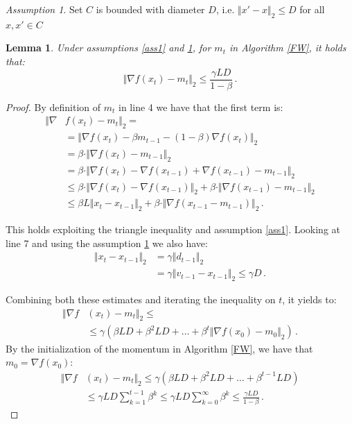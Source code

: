 \documentclass[10pt,twocolumn,letterpaper, english]{article}
\theoremstyle{definition}
\theoremstyle{plain}
\theoremstyle{plain}
\newtheorem{lemma}{Lemma}[subsection]
\theoremstyle{plain}
\theoremstyle{plain}
\theoremstyle{remark}
\theoremstyle{remark}
\newtheorem{ass}{Assumption}[subsection]
\theoremstyle{definition}
\theoremstyle{definition}
\theoremstyle{definition}
\theoremstyle{definition}
\begin{document}
\begin{ass}\label{ass2}
Set $C$ is bounded with diameter $D$, i.e. $\Vert x' -x \Vert_{2} \le D$ for all $x, x' \in C$

\end{ass}

\begin{lemma}
\label{lemm}
Under assumptions \ref{ass1} and \ref{ass2}, for $m_t$ in Algorithm \ref{FW}, it holds that:
\begin{equation*}
    \Vert \nabla f(x_t) - m_t \Vert_{2} \le \frac{\gamma LD}{ 1 - \beta}\,.
\end{equation*}
\end{lemma}

\begin{proof}
By definition of $m_t$ in line 4 we have that the first term is:
\begin{align*}
    \Vert \nabla & f(x_t) - m_t \Vert_2 = \\
    &= \Vert \nabla f(x_t) - \beta m_{t-1} - (1- \beta) \nabla f(x_t) \Vert_2\\
    &= \beta \cdot \Vert \nabla f(x_t) - m_{t-1} \Vert_{2}\\
    &= \beta \cdot \Vert \nabla f(x_t) - \nabla f(x_{t-1}) + \nabla f(x_{t-1}) - m_{t-1} \Vert_{2}\\
    &\le \beta \cdot \Vert \nabla f(x_t) - \nabla f(x_{t-1}) \Vert_{2} + \beta \cdot \Vert \nabla f(x_{t-1}) - m_{t-1} \Vert_{2} \\
    &\le \beta L \Vert x_t - x_{t-1} \Vert_{2} + \beta \cdot \Vert \nabla f(x_{t-1} - m_{t-1}) \Vert_{2}\,.
\end{align*}

This holds exploiting the triangle inequality and assumption \ref{ass1}. 
Looking at line 7 and using the assumption \ref{ass2} we also have:
\begin{align*}
    \Vert x_t - x_{t-1} \Vert_{2} & = \gamma \Vert d_{t-1} \Vert_{2} \\
    &= \gamma \Vert v_{t-1} - x_{t-1} \Vert_{2} \le \gamma D\,.
\end{align*}

Combining both these estimates and iterating the inequality on $t$, it yields to:
\begin{align*}
    \Vert \nabla f & (x_t) - m_t \Vert_2 \le 
    \\
    &\le \gamma ( \beta LD + \beta^2 LD + \dots + \beta^t \Vert \nabla f(x_0) - m_0 \Vert_2 ) \,.
\end{align*}
By the initialization of the momentum in Algorithm \ref{FW}, we have that $m_0 = \nabla f(x_0)$:
\begin{align*}
    \Vert \nabla f &(x_t) - m_t \Vert_2 \le \gamma(\beta L D + \beta^2 L D + \dots + \beta^{t-1} L D)\\
    &\le \gamma LD \sum_{k=1}^{t-1} \beta^k \le \gamma LD \sum_{k=0}^{\infty} \beta^k \le \frac{\gamma LD }{1-\beta}\,.
\end{align*}
\end{proof}
\end{document}
